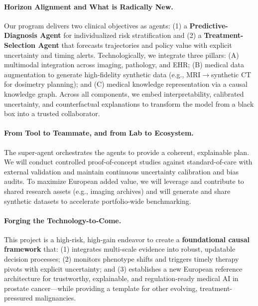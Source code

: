 \documentclass[11pt, a4paper]{article}
\begin{document}
\paragraph{Horizon Alignment and What is Radically New.} Our program delivers two clinical objectives as agents: (1) a \textbf{Predictive-Diagnosis Agent} for individualized risk stratification and (2) a \textbf{Treatment-Selection Agent} that forecasts trajectories and policy value with explicit uncertainty and timing alerts. Technologically, we integrate three pillars: (A) multimodal integration across imaging, pathology, and EHR; (B) medical data augmentation to generate high-fidelity synthetic data (e.g., MRI$\rightarrow$synthetic CT for dosimetry planning); and (C) medical knowledge representation via a causal knowledge graph. Across all components, we embed interpretability, calibrated uncertainty, and counterfactual explanations to transform the model from a black box into a trusted collaborator.

\paragraph{From Tool to Teammate, and from Lab to Ecosystem.} The super-agent orchestrates the agents to provide a coherent, explainable plan. We will conduct controlled proof-of-concept studies against standard-of-care with external validation and maintain continuous uncertainty calibration and bias audits. To maximize European added value, we will leverage and contribute to shared research assets (e.g., imaging archives) and will generate and share synthetic datasets to accelerate portfolio-wide benchmarking.

\paragraph{Forging the Technology-to-Come.} This project is a high-risk, high-gain endeavor to create a \textbf{foundational causal framework} that: (1) integrates multi-scale evidence into robust, updatable decision processes; (2) monitors phenotype shifts and triggers timely therapy pivots with explicit uncertainty; and (3) establishes a new European reference architecture for trustworthy, explainable, and regulation-ready medical AI in prostate cancer—while providing a template for other evolving, treatment-pressured malignancies.
\end{document}
